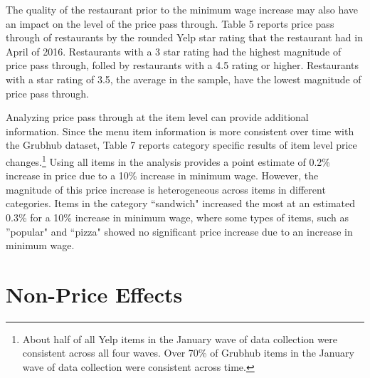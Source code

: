 \documentclass[11pt]{article}
\begin{document}
The quality of the restaurant prior to the minimum wage increase may also have an impact on the level of the price pass through. Table 5 reports price pass through of restaurants by the rounded Yelp star rating that the restaurant had in April of 2016. Restaurants with a 3 star rating had the highest magnitude of price pass through, folled by restaurants with a 4.5 rating or higher. Restaurants with a star rating of 3.5, the average in the sample, have the lowest magnitude of price pass through.

Analyzing price pass through at the item level can provide additional information. Since the menu item information is more consistent over time with the Grubhub dataset, Table 7 reports category specific results of item level price changes.\footnote{About half of all Yelp items in the January wave of data collection were consistent across all four waves. Over 70\% of Grubhub items in the January wave of data collection were consistent across time.} Using all items in the analysis provides a point estimate of 0.2\% increase in price due to a 10\% increase in minimum wage. However, the magnitude of this price increase is heterogeneous across items in different categories. Items in the category ``sandwich" increased the most at an estimated 0.3\% for a 10\% increase in minimum wage, where some types of items, such as ''popular" and ``pizza" showed no significant price increase due to an increase in minimum wage. 








\section{Non-Price Effects}
\end{document}
